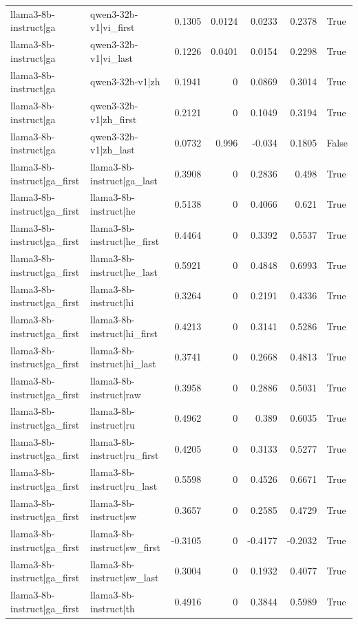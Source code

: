 \begin{table}
\begin{tabular}{l l r r r r l}
llama3-8b-instruct|ga & qwen3-32b-v1|vi_first & 0.1305 & 0.0124 & 0.0233 & 0.2378 & True \\
llama3-8b-instruct|ga & qwen3-32b-v1|vi_last & 0.1226 & 0.0401 & 0.0154 & 0.2298 & True \\
llama3-8b-instruct|ga & qwen3-32b-v1|zh & 0.1941 & 0 & 0.0869 & 0.3014 & True \\
llama3-8b-instruct|ga & qwen3-32b-v1|zh_first & 0.2121 & 0 & 0.1049 & 0.3194 & True \\
llama3-8b-instruct|ga & qwen3-32b-v1|zh_last & 0.0732 & 0.996 & -0.034 & 0.1805 & False \\
llama3-8b-instruct|ga_first & llama3-8b-instruct|ga_last & 0.3908 & 0 & 0.2836 & 0.498 & True \\
llama3-8b-instruct|ga_first & llama3-8b-instruct|he & 0.5138 & 0 & 0.4066 & 0.621 & True \\
llama3-8b-instruct|ga_first & llama3-8b-instruct|he_first & 0.4464 & 0 & 0.3392 & 0.5537 & True \\
llama3-8b-instruct|ga_first & llama3-8b-instruct|he_last & 0.5921 & 0 & 0.4848 & 0.6993 & True \\
llama3-8b-instruct|ga_first & llama3-8b-instruct|hi & 0.3264 & 0 & 0.2191 & 0.4336 & True \\
llama3-8b-instruct|ga_first & llama3-8b-instruct|hi_first & 0.4213 & 0 & 0.3141 & 0.5286 & True \\
llama3-8b-instruct|ga_first & llama3-8b-instruct|hi_last & 0.3741 & 0 & 0.2668 & 0.4813 & True \\
llama3-8b-instruct|ga_first & llama3-8b-instruct|raw & 0.3958 & 0 & 0.2886 & 0.5031 & True \\
llama3-8b-instruct|ga_first & llama3-8b-instruct|ru & 0.4962 & 0 & 0.389 & 0.6035 & True \\
llama3-8b-instruct|ga_first & llama3-8b-instruct|ru_first & 0.4205 & 0 & 0.3133 & 0.5277 & True \\
llama3-8b-instruct|ga_first & llama3-8b-instruct|ru_last & 0.5598 & 0 & 0.4526 & 0.6671 & True \\
llama3-8b-instruct|ga_first & llama3-8b-instruct|sw & 0.3657 & 0 & 0.2585 & 0.4729 & True \\
llama3-8b-instruct|ga_first & llama3-8b-instruct|sw_first & -0.3105 & 0 & -0.4177 & -0.2032 & True \\
llama3-8b-instruct|ga_first & llama3-8b-instruct|sw_last & 0.3004 & 0 & 0.1932 & 0.4077 & True \\
llama3-8b-instruct|ga_first & llama3-8b-instruct|th & 0.4916 & 0 & 0.3844 & 0.5989 & True \\

\end{tabular}
\end{table}
